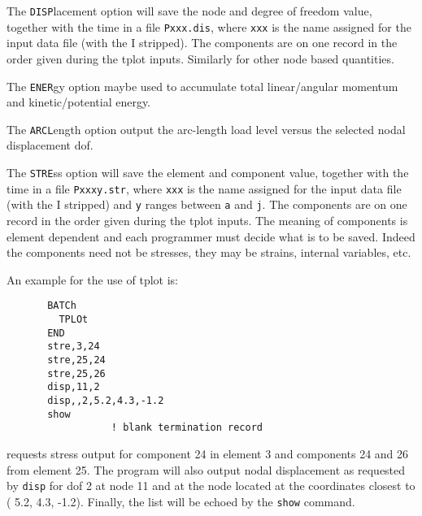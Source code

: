 The {\tt DISP}lacement option will save the node and degree
of freedom value, together with the time in a file {\tt Pxxx.dis},
where {\tt xxx} is the name assigned for the input data file (with
the I stripped).  The components are on one record in the
order given during the tplot inputs.  Similarly for other
node based quantities.

The {\tt ENER}gy option maybe used to accumulate total
linear/angular momentum and kinetic/potential energy.

The {\tt ARCL}ength option output the arc-length load level
versus the selected nodal displacement dof.

The {\tt STRE}ss option will save the element and component
value, together with the time in a file {\tt Pxxxy.str}, where {\tt xxx}
is the name assigned for the input data file (with the I
stripped) and {\tt y} ranges between {\tt a} and {\tt j}.
The components are on one record in the order
given during the tplot inputs.  The meaning of components is
element dependent and each programmer must decide what is to
be saved.  Indeed the components need not be stresses, they
may be strains, internal variables, etc.

An example for the use of tplot is:
\begin{verbatim}
       BATCh
         TPLOt
       END
       stre,3,24
       stre,25,24
       stre,25,26
       disp,11,2
       disp,,2,5.2,4.3,-1.2
       show
                  ! blank termination record
\end{verbatim}
requests stress output for component 24 in element 3 and components 24
and 26 from element 25.  The program will also
output nodal displacement as requested by {\tt disp} for dof 2 at
node 11 and at the node located at the coordinates closest to
( 5.2, 4.3, -1.2).  Finally, the list will be echoed by the {\tt show} command.
\vfill\eject
